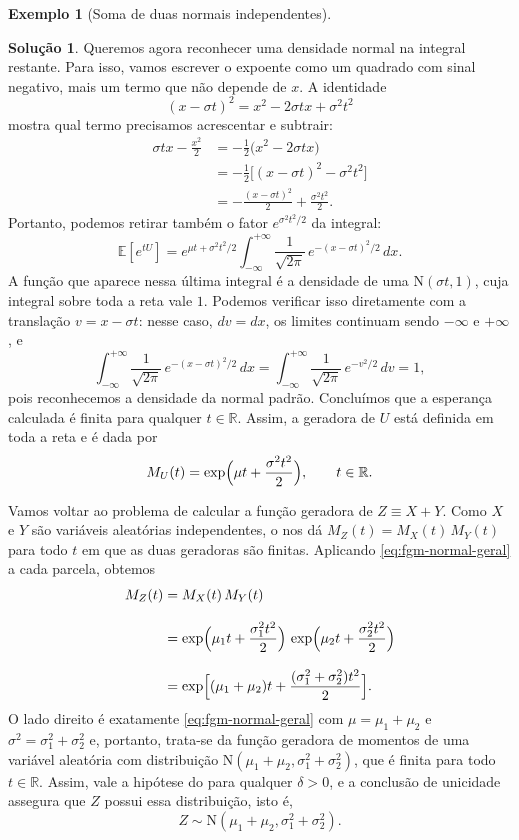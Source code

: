 \documentclass[12pt,portuguese]{article}
\theoremstyle{definition}
\newtheorem{example}[example]{Exemplo}
\theoremstyle{plainexercise}
\theoremstyle{starredexercise}
\theoremstyle{definition}
\newtheorem*{solution}{Solução}
\begin{document}
\begin{example}[Soma de duas normais independentes]
\begin{solution}
Queremos agora reconhecer uma densidade normal na integral restante.
Para isso, vamos escrever o expoente como um quadrado com sinal negativo,
mais um termo que não depende de $x$. A identidade
\[
(x-\sigma t)^2=x^2-2\sigma t x+\sigma^2t^2
\]
mostra qual termo precisamos acrescentar e subtrair:
\begin{align*}
\sigma t x-\frac{x^2}{2}
&=-\frac{1}{2}\bigl(x^2-2\sigma t x\bigr)
\\[0.3cm]
&=-\frac{1}{2}\bigl[(x-\sigma t)^2-\sigma^2t^2\bigr]
\\[0.3cm]
&=-\frac{(x-\sigma t)^2}{2}+\frac{\sigma^2t^2}{2}.
\end{align*}
Portanto, podemos retirar também o fator $e^{\sigma^2t^2/2}$ da integral:
\[
\mathbb{E}[e^{tU}]
=e^{\mu t+\sigma^2t^2/2}
\int_{-\infty}^{+\infty}
\frac{1}{\sqrt{2\pi}}\,e^{-(x-\sigma t)^2/2}\,dx.
\]
A função que aparece nessa última integral é a densidade de uma
$\mathrm{N}(\sigma t,1)$, cuja integral sobre toda a reta vale $1$.
Podemos verificar isso diretamente com a translação
$v=x-\sigma t$: nesse caso, $dv=dx$, os limites continuam sendo
$-\infty$ e $+\infty$, e
\[
\int_{-\infty}^{+\infty}
\frac{1}{\sqrt{2\pi}}\,e^{-(x-\sigma t)^2/2}\,dx
=\int_{-\infty}^{+\infty}
\frac{1}{\sqrt{2\pi}}\,e^{-v^2/2}\,dv
=1,
\]
pois reconhecemos a densidade da normal padrão. Concluímos que a
esperança calculada é finita para qualquer $t\in\mathbb{R}$. Assim, a
geradora de $U$ está definida em toda a reta e é dada por
\begin{equation}\label{eq:fgm-normal-geral}
M_U(t)=\exp\Bigl(\mu t+\frac{\sigma^2t^2}{2}\Bigr),
\qquad t\in\mathbb{R}.
\end{equation}

Vamos voltar ao problema de calcular a função geradora de $Z\equiv X+Y$. 
Como $X$ e $Y$ são variáveis aleatórias independentes, o
 nos dá $M_Z(t)=M_X(t)\,M_Y(t)$ para todo $t$ em que
as duas geradoras são finitas. Aplicando \eqref{eq:fgm-normal-geral} a
cada parcela, obtemos
\begin{align*}
M_Z(t)
&= M_X(t)\,M_Y(t) \\[0.3cm]
&=
\exp\Bigl(\mu_1t+\frac{\sigma_1^2t^2}{2}\Bigr)\,
\exp\Bigl(\mu_2t+\frac{\sigma_2^2t^2}{2}\Bigr) \\[0.3cm]
&=
\exp\Bigl[(\mu_1+\mu_2)t+\frac{(\sigma_1^2+\sigma_2^2)t^2}{2}\Bigr].
\end{align*}
O lado direito é exatamente \eqref{eq:fgm-normal-geral} com
$\mu=\mu_1+\mu_2$ e $\sigma^2=\sigma_1^2+\sigma_2^2$ e, portanto, trata-se da função
geradora de momentos de uma variável aleatória 
com distribuição $\mathrm{N}(\mu_1+\mu_2,\sigma_1^2+\sigma_2^2)$,
que é finita para todo $t\in\mathbb{R}$. Assim, vale a hipótese do
 para qualquer $\delta>0$, e a conclusão de
unicidade assegura que $Z$ possui essa distribuição, isto é,
\[
Z \sim \mathrm{N}(\mu_1+\mu_2, \sigma_1^2+\sigma_2^2).
\]
\end{solution}
\end{example}
\end{document}
